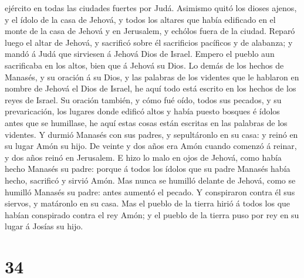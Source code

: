 ejército en todas las ciudades fuertes por Judá. 
Asimismo quitó los dioses ajenos, y el ídolo de la casa de Jehová, y
todos los altares que había edificado en el monte de la casa de Jehová y
en Jerusalem, y echólos fuera de la ciudad.  Reparó luego
el altar de Jehová, y sacrificó sobre él sacrificios pacíficos y de
alabanza; y mandó á Judá que sirviesen á Jehová Dios de Israel.
 Empero el pueblo aun sacrificaba en los altos, bien que
á Jehová su Dios.  Lo demás de los hechos de Manasés, y
su oración á su Dios, y las palabras de los videntes que le hablaron en
nombre de Jehová el Dios de Israel, he aquí todo está escrito en los
hechos de los reyes de Israel.  Su oración también, y
cómo fué oído, todos sus pecados, y su prevaricación, los lugares donde
edificó altos y había puesto bosques é ídolos antes que se humillase, he
aquí estas cosas están escritas en las palabras de los videntes.
 Y durmió Manasés con sus padres, y sepultáronlo en su
casa: y reinó en su lugar Amón su hijo.  De veinte y dos
años era Amón cuando comenzó á reinar, y dos años reinó en Jerusalem.
 E hizo lo malo en ojos de Jehová, como había hecho
Manasés su padre: porque á todos los ídolos que su padre Manasés había
hecho, sacrificó y sirvió Amón.  Mas nunca se humilló
delante de Jehová, como se humilló Manasés su padre: antes aumentó el
pecado.  Y conspiraron contra él sus siervos, y matáronlo
en su casa.  Mas el pueblo de la tierra hirió á todos los
que habían conspirado contra el rey Amón; y el pueblo de la tierra puso
por rey en su lugar á Josías su hijo. 

\hypertarget{section-33}{%
\section{34}\label{section-33}}

